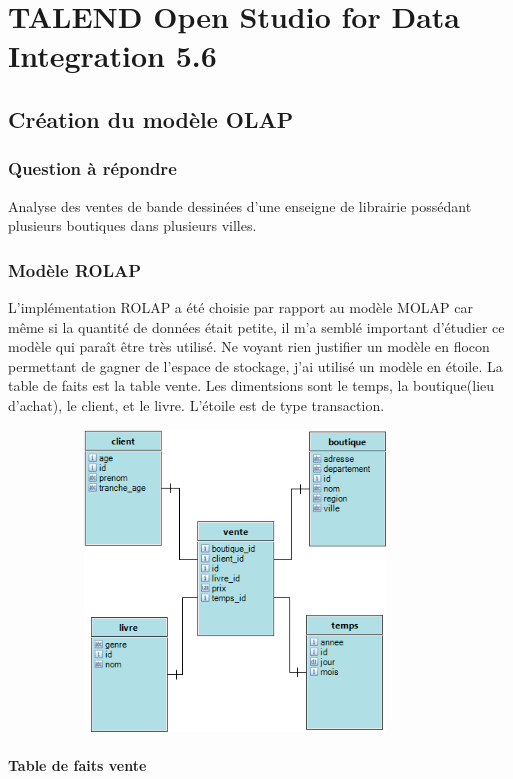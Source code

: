 
\chapter{TALEND Open Studio for Data Integration 5.6}

\section{Création du modèle OLAP}
\subsection{Question à répondre}
Analyse des ventes de bande dessinées d'une enseigne de librairie possédant plusieurs boutiques dans plusieurs villes.

\subsection{Modèle ROLAP}

L'implémentation ROLAP a été choisie par rapport au modèle MOLAP car même si la quantité de données était petite, il m'a semblé important d'étudier ce modèle qui paraît être très utilisé. Ne voyant rien justifier un modèle en flocon permettant de gagner de l'espace de stockage, j'ai utilisé un modèle en étoile.
La table de faits est la table vente. Les dimentsions sont le temps, la boutique(lieu d'achat), le client, et le livre. L'étoile est de type transaction.

\includegraphics[clip=true, width=120mm, height=80mm]{images/Talend.png} 



\subsubsection{Table de faits vente}

